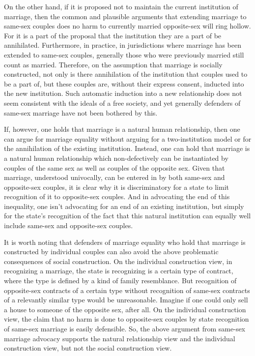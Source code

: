 On the other hand, if it is proposed not to maintain the current institution of marriage, then the common and plausible
arguments that extending marriage to same-sex couples does no harm to currently married opposite-sex will ring hollow. For it is a part of the proposal that the
institution they are a part of be annihilated. Furthermore, in practice, in jurisdictions where marriage has been extended to same-sex couples, generally those who were
previously married still count as married. Therefore, on the assumption that marriage is socially constructed, not only is there annihilation of the institution
that couples used to be a part of, but these couples are, without their express consent, inducted into the new institution. Such automatic induction into a new
relationship does not seem consistent with the ideals of a free society, and yet generally defenders of same-sex marriage have not been bothered by this.

If, however, one holds that marriage is a natural human relationship, then one can argue for marriage equality without arguing for a two-institution model or for
the annihilation of the existing institution. Instead, one can hold that marriage is a natural human relationship which non-defectively can be instantiated by
couples of the same sex as well as couples of the opposite sex. Given that marriage, understood univocally, can be entered in by both same-sex and opposite-sex couples, it is clear why
it is discriminatory for a state to limit recognition of it to opposite-sex couples. And in advocating the end of this inequality, one isn't advocating for an end of
an existing institution, but simply for the state's recognition of the fact that this natural institution can equally well include same-sex and opposite-sex couples.

It is worth noting that defenders of marriage equality who  hold that marriage is constructed by individual couples can also avoid the above problematic consequences
of social construction. On the individual construction view, in recognizing a marriage, the state is recognizing is a certain type of contract, where the type is
defined by a kind of family resemblance. But recognition of opposite-sex contracts
of a certain type without recognition of same-sex contracts of a relevantly similar type would be unreasonable. Imagine if one could only sell a house to someone of
the opposite sex, after all. On the individual construction view, the claim that no harm is done to opposite-sex couples by state recognition of same-sex marriage is
easily defensible. So, the above argument from same-sex marriage advocacy supports the natural relationship view and the individual construction view, but not the social
construction view.

